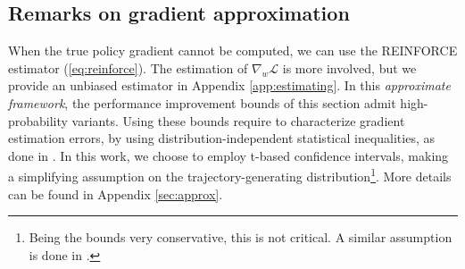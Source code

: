 \subsection{Remarks on gradient approximation}\label{sec:approx_short}
When the true policy gradient cannot be computed, we can use the REINFORCE estimator (\ref{eq:reinforce}). The estimation of $\nabla_w\mathcal{L}$ is more involved, but we provide an unbiased estimator in Appendix \ref{app:estimating}. In this \textit{approximate framework}, the performance improvement bounds of this section admit high-probability variants. Using these bounds require to characterize gradient estimation errors, \eg by using distribution-independent statistical inequalities, as done in \cite{adaptive_batch}. In this work, we choose to employ t-based confidence intervals, making a simplifying assumption on the trajectory-generating distribution\footnote{Being the bounds very conservative, this is not critical. A similar assumption is done in \cite{pmlr-v37-thomas15}.}. More details can be found in Appendix \ref{sec:approx}.

